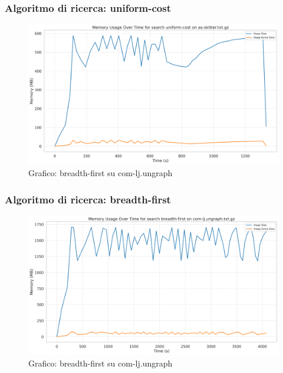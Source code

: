 \documentclass{article}
\begin{document}
\subsubsection{Algoritmo di ricerca: uniform-cost}
\begin{figure}[h]\centering
\includegraphics[width=\textwidth]{../plots/as-skitter_uniform-cost.png}
\caption{Grafico: breadth-first su com-lj.ungraph}
\end{figure}
\subsubsection{Algoritmo di ricerca: breadth-first}
\begin{figure}[h]\centering
\includegraphics[width=\textwidth]{../plots/com-lj.ungraph_breadth-first.png}
\caption{Grafico: breadth-first su com-lj.ungraph}
\end{figure}
\end{document}
